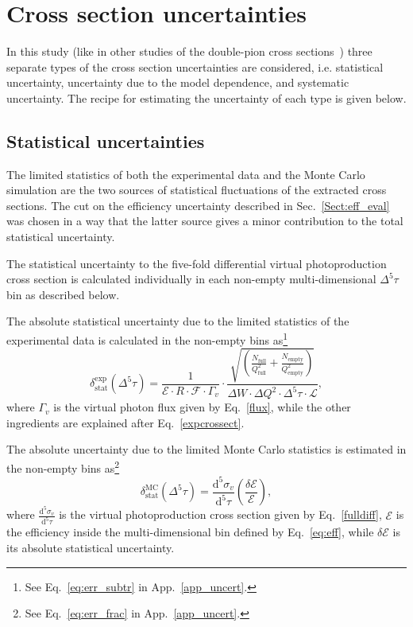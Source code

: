 \chapter{Cross section uncertainties}
\label{Sect:uncert}

In this study (like in other studies of the double-pion cross sections~\cite{Rip_an_note:2002,Ripani:2002ss,Fed_an_note:2007,Fedotov:2008aa,Isupov:2017lnd,Arjun,Fed_an_note:2017,Fed_paper_2018}) three separate types of the cross section uncertainties are considered, i.e. statistical uncertainty, uncertainty due to the model dependence, and systematic uncertainty. The recipe for estimating the uncertainty of each type is given below. 


\section{Statistical uncertainties}
\label{Sect:stat_uncert}


The limited statistics of both the experimental data and the Monte Carlo simulation are the two sources of statistical fluctuations of the extracted 
cross sections. The cut on the efficiency uncertainty described in Sec.~\ref{Sect:eff_eval} was chosen in a way that the latter source gives a minor contribution to the total statistical uncertainty.

The statistical uncertainty to the five-fold differential virtual photoproduction cross section is calculated individually in each non-empty multi-dimensional $\Delta^{5}\tau$ bin as described below.

The absolute statistical  uncertainty due to the limited statistics of the experimental data is calculated in the non-empty bins as\footnote[1]{See Eq.~\eqref{eq:err_subtr} in App.~\ref{app_uncert}.}
\begin{equation}
\delta_{\text{stat}}^{\text{exp}}(\Delta^{5} \tau) = \frac{1}{\mathcal{E} \! \cdot \! R \! \cdot \! \mathcal{F} \! \cdot \! \Gamma_{v} }  \cdot  \frac{\sqrt{\left( \frac{N_{\text{full}}}{Q_{\text{full}}^{2}}+\frac{N_{\text{empty}}}{Q_{\text{empty}}^{2}} \right) } }{
\Delta W \! \cdot \!  \Delta Q^{2} \! \cdot \!  \Delta^{5} \tau \! \cdot \! \mathcal{L}},
\label{staterrors}
\end{equation}
where $\Gamma_{v}$ is the virtual photon flux given by Eq.~\eqref{flux}, while the other ingredients are explained after Eq.~\eqref{expcrossect}.


The absolute uncertainty due to the limited Monte Carlo statistics is estimated in the non-empty bins as\footnote[2]{See Eq.~\eqref{eq:err_frac} in App.~\ref{app_uncert}.}
\begin{equation}
\delta_{\text{stat}}^{\text{MC}}(\Delta^{5} \tau) = \frac{\textrm{d}^{5}\sigma_{v}}{\textrm{d}^{5}\tau} \left( \frac{\delta \mathcal{E}}{\mathcal{E}} \right),
\label{montecarloerror}
\end{equation}
where $\frac{\textrm{d}^{5}\sigma_{v}}{\textrm{d}^{5}\tau}$ is the virtual photoproduction cross section given by Eq.~\eqref{fulldiff}, $\mathcal{E}$ is the efficiency inside the multi-dimensional bin defined by Eq.~\eqref{eq:eff}, while $\delta \mathcal{E}$ is its absolute statistical uncertainty. 


